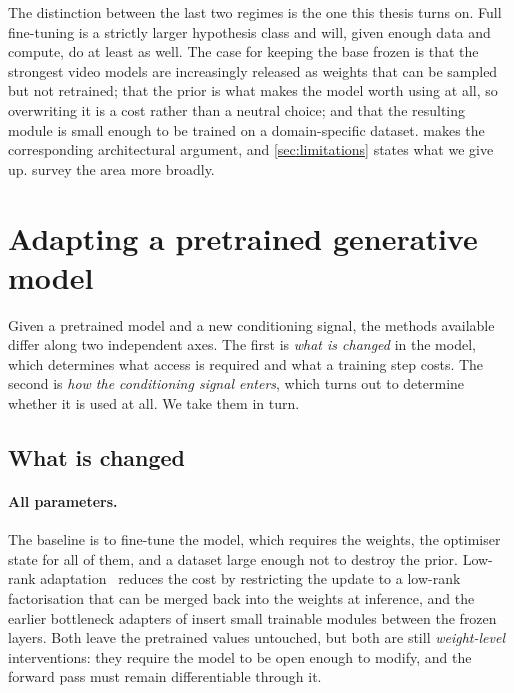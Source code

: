 \medskip

The distinction between the last two regimes is the one this thesis turns
on. Full fine-tuning is a strictly larger hypothesis class and will, given
enough data and compute, do at least as well. The case for keeping the base
frozen is that the strongest video models are increasingly released as
weights that can be sampled but not retrained; that the prior is what makes
the model worth using at all, so overwriting it is a cost rather than a
neutral choice; and that the resulting module is small enough to be trained
on a domain-specific dataset.  makes the corresponding
architectural argument, and \cref{sec:limitations} states what we give up.
 survey the area more broadly.

\section{Adapting a pretrained generative model}
\label{sec:rw-adapters}

Given a pretrained model and a new conditioning signal, the methods
available differ along two independent axes. The first is \emph{what is
changed} in the model, which determines what access is required and what a
training step costs. The second is \emph{how the conditioning signal
enters}, which turns out to determine whether it is used at all. We take
them in turn.

\subsection{What is changed}
\label{sec:rw-what-changes}

\paragraph{All parameters.} The baseline is to fine-tune the model, which
requires the weights, the optimiser state for all of them, and a dataset
large enough not to destroy the prior. Low-rank
adaptation~\citep{hu2022lora} reduces the cost by restricting the update to
a low-rank factorisation that can be merged back into the weights at
inference, and the earlier bottleneck adapters of
\citet{houlsby2019adapters} insert small trainable modules between the
frozen layers. Both leave the pretrained values untouched, but both are
still \emph{weight-level} interventions: they require the model to be open
enough to modify, and the forward pass must remain differentiable through
it.

